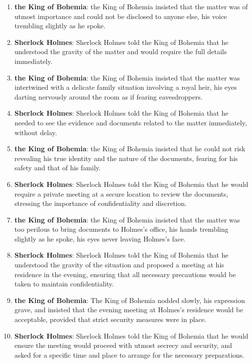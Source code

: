 \documentclass[10pt]{article}
\begin{document}
\begin{enumerate}
\item \textbf{the King of Bohemia}: the King of Bohemia insisted that the matter was of utmost importance and could not be disclosed to anyone else, his voice trembling slightly as he spoke.

\item \textbf{Sherlock Holmes}: Sherlock Holmes told the King of Bohemia that he understood the gravity of the matter and would require the full details immediately.

\item \textbf{the King of Bohemia}: the King of Bohemia insisted that the matter was intertwined with a delicate family situation involving a royal heir, his eyes darting nervously around the room as if fearing eavesdroppers.

\item \textbf{Sherlock Holmes}: Sherlock Holmes told the King of Bohemia that he needed to see the evidence and documents related to the matter immediately, without delay.

\item \textbf{the King of Bohemia}: the King of Bohemia insisted that he could not risk revealing his true identity and the nature of the documents, fearing for his safety and that of his family.

\item \textbf{Sherlock Holmes}: Sherlock Holmes told the King of Bohemia that he would require a private meeting at a secure location to review the documents, stressing the importance of confidentiality and discretion.

\item \textbf{the King of Bohemia}: the King of Bohemia insisted that the matter was too perilous to bring documents to Holmes's office, his hands trembling slightly as he spoke, his eyes never leaving Holmes's face.

\item \textbf{Sherlock Holmes}: Sherlock Holmes told the King of Bohemia that he understood the gravity of the situation and proposed a meeting at his residence in the evening, ensuring that all necessary precautions would be taken to maintain confidentiality.

\item \textbf{the King of Bohemia}: The King of Bohemia nodded slowly, his expression grave, and insisted that the evening meeting at Holmes's residence would be acceptable, provided that strict security measures were in place.

\item \textbf{Sherlock Holmes}: Sherlock Holmes told the King of Bohemia that he would ensure the meeting would proceed with utmost secrecy and security, and asked for a specific time and place to arrange for the necessary preparations.

\end{enumerate}
\end{document}
